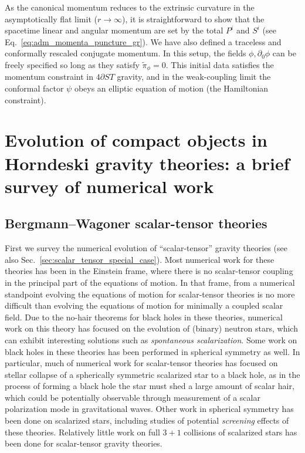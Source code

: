 \documentclass{ws-ijmpd}
\begin{document}
As the canonical momentum reduces to the extrinsic curvature in the
asymptotically flat limit ($r\to\infty$), it is straightforward to
show that the spacetime linear and angular momentum are set by
the total $P^i$ and $S^i$ 
(see Eq.~\eqref{eq:adm_momenta_puncture_gr})\cite{Kovacs:2021lgk}.
We have also defined a traceless and conformally rescaled
conjugate momentum.
In this setup, 
the fields $\phi,\partial_0\phi$ can be freely specified so long
as they satisfy $\tilde{\pi}_{\phi}=0$.
This initial data satisfies the momentum constraint in 
$4\partial ST$ gravity, and in the weak-coupling limit
the conformal factor $\psi$ obeys an elliptic equation of motion
(the Hamiltonian constraint).


\section{Evolution of compact objects in 
Horndeski gravity theories: a brief survey of numerical work
\label{sec:general_survey_numerical_work}}

\subsection{Bergmann--Wagoner scalar-tensor theories
\label{sec:scalar_tensor_special_case_numerical}}
   First we survey the numerical evolution of ``scalar-tensor'' gravity
theories (see also Sec.~\ref{sec:scalar_tensor_special_case}).
Most numerical work for these theories
has been in the Einstein frame,
where there is no scalar-tensor coupling in the principal part
of the equations of motion.
In that frame, from a numerical standpoint evolving the equations
of motion for scalar-tensor theories is no more difficult than
evolving the equations of motion for minimally a coupled scalar field.
Due to the no-hair theorems for black holes in these 
theories\cite{Hawking:1972qk,Herdeiro:2015waa},
numerical work on this theory has focused on the evolution
of (binary) neutron stars, which can exhibit interesting solutions such as 
\emph{spontaneous scalarization}\cite{Damour:1996ke}.
Some work on black holes in these theories
has been performed in spherical symmetry as 
well\cite{Scheel:1994yr,Scheel:1994yn}.
In particular, much of numerical work for scalar-tensor
theories has focused on stellar collapse of
a spherically symmetric scalarized star to a black hole, as in the process
of forming a black hole the star must shed a large amount
of scalar hair, which could be potentially observable
through measurement of a scalar polarization mode in gravitational 
waves\cite{Novak:1999jg,
Gerosa:2016fri,
Sperhake:2017itk,
Cheong:2018gzn,
Rosca-Mead:2019seq,Rosca-Mead:2020ehn,Geng:2020slq,
Huang:2021tpu,Kuan:2021yih,
Kuan:2022oxs}.
Other work in spherical symmetry has been done on scalarized
stars\cite{Mendes:2021fon}, including studies
of potential \emph{screening} 
effects\cite{Khoury:2003aq,Khoury:2003rn,Joyce:2014kja,Quiros:2019ktw} 
of these theories\cite{Dima:2021pwx}. 
Relatively little work on full $3+1$ collisions 
of scalarized stars has been done for scalar-tensor gravity theories.
\end{document}
